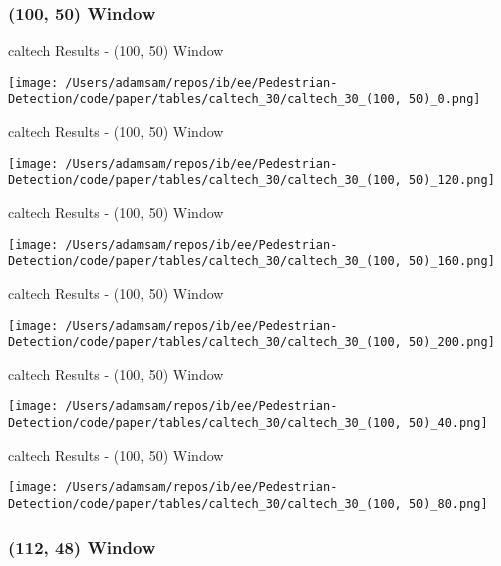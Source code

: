 
\subsubsection*{(100, 50) Window}

\begin{table}
    \caption{caltech Results - (100, 50) Window}
    \texttt{[image: /Users/adamsam/repos/ib/ee/Pedestrian-Detection/code/paper/tables/caltech\_30/caltech\_30\_(100, 50)\_0.png]}
    \label{tab:caltech_30_(100, 50)_0}
\end{table}

\begin{table}
    \caption{caltech Results - (100, 50) Window}
    \texttt{[image: /Users/adamsam/repos/ib/ee/Pedestrian-Detection/code/paper/tables/caltech\_30/caltech\_30\_(100, 50)\_120.png]}
    \label{tab:caltech_30_(100, 50)_120}
\end{table}

\begin{table}
    \caption{caltech Results - (100, 50) Window}
    \texttt{[image: /Users/adamsam/repos/ib/ee/Pedestrian-Detection/code/paper/tables/caltech\_30/caltech\_30\_(100, 50)\_160.png]}
    \label{tab:caltech_30_(100, 50)_160}
\end{table}

\begin{table}
    \caption{caltech Results - (100, 50) Window}
    \texttt{[image: /Users/adamsam/repos/ib/ee/Pedestrian-Detection/code/paper/tables/caltech\_30/caltech\_30\_(100, 50)\_200.png]}
    \label{tab:caltech_30_(100, 50)_200}
\end{table}

\begin{table}
    \caption{caltech Results - (100, 50) Window}
    \texttt{[image: /Users/adamsam/repos/ib/ee/Pedestrian-Detection/code/paper/tables/caltech\_30/caltech\_30\_(100, 50)\_40.png]}
    \label{tab:caltech_30_(100, 50)_40}
\end{table}

\begin{table}
    \caption{caltech Results - (100, 50) Window}
    \texttt{[image: /Users/adamsam/repos/ib/ee/Pedestrian-Detection/code/paper/tables/caltech\_30/caltech\_30\_(100, 50)\_80.png]}
    \label{tab:caltech_30_(100, 50)_80}
\end{table}

\subsubsection*{(112, 48) Window}

